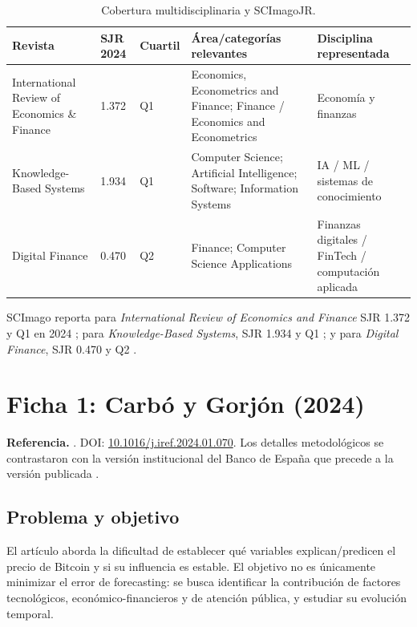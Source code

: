 \documentclass[11pt,letterpaper]{article}
\begin{document}
\begin{table}[ht]
\centering
\small
\caption{Cobertura multidisciplinaria y SCImagoJR.}
\begin{tabularx}{\textwidth}{p{} p{} p{} X p{}}
\toprule
\textbf{Revista} & \textbf{SJR 2024} & \textbf{Cuartil} & \textbf{Área/categorías relevantes} & \textbf{Disciplina representada} \\
\midrule
International Review of Economics \& Finance & 1.372 & Q1 & Economics, Econometrics and Finance; Finance / Economics and Econometrics & Economía y finanzas \\
Knowledge-Based Systems & 1.934 & Q1 & Computer Science; Artificial Intelligence; Software; Information Systems & IA / ML / sistemas de conocimiento \\
Digital Finance & 0.470 & Q2 & Finance; Computer Science Applications & Finanzas digitales / FinTech / computación aplicada \\
\bottomrule
\end{tabularx}
\end{table}

SCImago reporta para \emph{International Review of Economics and Finance} SJR 1.372 y Q1 en 2024 \parencite{scimagoiref}; para \emph{Knowledge-Based Systems}, SJR 1.934 y Q1 \parencite{scimagokbs}; y para \emph{Digital Finance}, SJR 0.470 y Q2 \parencite{scimagodf}.

\section{Ficha 1: Carbó y Gorjón (2024)}

\textbf{Referencia.} \textcite{carbo2024}. DOI: \href{https://doi.org/10.1016/j.iref.2024.01.070}{10.1016/j.iref.2024.01.070}. Los detalles metodológicos se contrastaron con la versión institucional del Banco de España que precede a la versión publicada \parencite{carbo2022wp}.

\subsection{Problema y objetivo}
El artículo aborda la dificultad de establecer qué variables explican/predicen el precio de Bitcoin y si su influencia es estable. El objetivo no es únicamente minimizar el error de forecasting: se busca identificar la contribución de factores tecnológicos, económico-financieros y de atención pública, y estudiar su evolución temporal.
\end{document}
